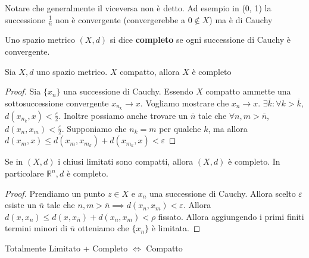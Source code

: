 Notare che generalmente il viceversa non è detto. Ad esempio in (0, 1) la
successione \(\frac{1}{n}\) non è convergente (convergerebbe a \(0 \not\in X\))
ma è di Cauchy
\begin{definition}
    Uno spazio metrico \((X, d)\) si dice \textbf{completo} se ogni successione
    di Cauchy è convergente.
\end{definition}
\begin{proposition}
    Sia \(X, d\) uno spazio metrico.
    \(X\) compatto, allora \(X\) è completo
\end{proposition}
\begin{proof}
    Sia \(\{x_{n}\} \) una successione di Cauchy. Essendo \(X\) compatto ammette
    una sottosuccessione convergente \(x_{n_k} \to x\). Vogliamo mostrare che
    \(x_{n} \to x\). \(\exists \overline{k}: \forall k > \overline{k}\),
    \(d(x_{n_k}, x) < \frac{\varepsilon}{2}\). Inoltre possiamo anche trovare un
    \(\overline{n}\) tale che \(\forall n, m > \overline{n}\), \(d(x_{n}, x_{m})
    < \frac{\varepsilon}{2}\). Supponiamo che \(n_k = m\) per qualche \(k\), ma
    allora \(d(x_{m}, x) \le d(x_{m}, x_{m_k}) + d(x_{m_k}, x) < \varepsilon\) 
\end{proof}
\begin{proposition}
    Se in \((X, d)\) i chiusi limitati sono compatti, allora \((X, d)\) è
    completo. In particolare \(\mathbb{R}^{n}, d\) è completo.
\end{proposition}
\begin{proof}
    Prendiamo un punto \(z \in X\) e \(x_{n}\) una successione di Cauchy. Allora
    scelto \(\varepsilon\) esiste un \(\overline{n}\) tale che \(n, m >
    \overline{n} \implies d(x_{n}, x_{m}) < \varepsilon\). Allora \(d(x, x_{n})
    \le d(x, x_{\overline{n}}) + d(x_{n}, x_{m}) < \rho\) fissato. Allora
    aggiungendo i primi finiti termini minori di \(\overline{n}\) otteniamo che
    \(\{x_{n}\} \) è limitata.
\end{proof}
\begin{proposition}
    Totalmente Limitato + Completo \(\iff\) Compatto
\end{proposition}
